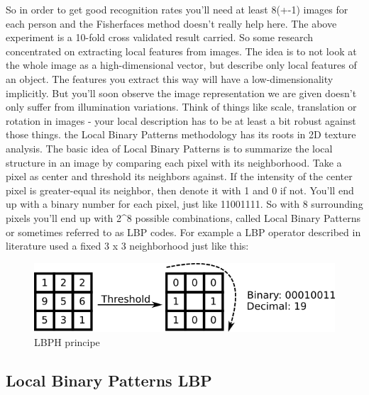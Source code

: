 \documentclass[a4paper,12pt]{report}
\begin{document}
\begin{itemize}
\begin{itemize}
\begin{itemize}
				So in order to get good recognition rates you’ll need at least 8(+-1) images for each person and the Fisherfaces method doesn’t really help here. The above experiment is a 10-fold cross validated result carried.
				So some research concentrated on extracting local features from images. The idea is to not look at the whole image as a high-dimensional vector, but describe only local features of an object. The features you extract this way will have a low-dimensionality implicitly. But you’ll soon observe the image representation we are given doesn’t only suffer from illumination variations. Think of things like scale, translation or rotation in images - your local description has to be at least a bit robust against those things. the Local Binary Patterns methodology has its roots in 2D texture analysis. The basic idea of Local Binary Patterns is to summarize the local structure in an image by comparing each pixel with its neighborhood. Take a pixel as center and threshold its neighbors against. If the intensity of the center pixel is greater-equal its neighbor, then denote it with 1 and 0 if not. You’ll end up with a binary number for each pixel, just like 11001111. So with 8 surrounding pixels you’ll end up with 2^8 possible combinations, called Local Binary Patterns or sometimes referred to as LBP codes. For example a LBP operator described in literature used a fixed 3 x 3 neighborhood just like this:
				
			\begin{figure}[h]
				\centering
				\caption{\label{face recognation} LBPH principe\cite{haar_lbp_hog_comp_pdf}}
				\includegraphics[scale=0.55]{pic2.png}
			\end{figure}
		
		\subsection{Local Binary Patterns LBP}
		

\end{itemize}
\end{itemize}
\end{itemize}
\end{document}
